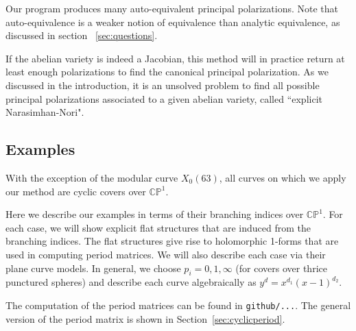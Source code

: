\documentclass[12pt,reqno]{amsart}
\newcommand{\C}{\mathbb{C}}
\renewcommand{\P}{\mathbb{P}}
\theoremstyle{definition}
\theoremstyle{remark}
\begin{document}
Our program produces many auto-equivalent principal polarizations.  Note that auto-equivalence is a weaker notion of equivalence than analytic equivalence, as discussed in section ~\ref{sec:questions}. 

If the abelian variety is indeed a Jacobian, this method will in practice return at least enough polarizations to find the canonical principal polarization. As we discussed in the introduction, it is an unsolved problem to find all possible principal polarizations associated to a given abelian variety, called ``explicit Narasimhan-Nori". 


\subsection{Examples}
\label{sec:examples}

With the exception of the modular curve $X_0(63)$, all curves on which we apply our method are cyclic covers over $\C\P^1.$ 

Here we describe our examples in terms of their branching indices over $\C\P^1.$ For each case, we will show explicit flat structures that are induced from the branching indices. The flat structures give rise to holomorphic 1-forms that are used in computing period matrices. We will also describe each case via their plane curve models. In general, we choose $p_i = 0, 1, \infty$ (for covers over thrice punctured spheres) and describe each curve algebraically as $y^d = x^{d_1} (x-1)^{d_2}.$

The computation of the period matrices can be found in \texttt{github/...}. The general version of the period matrix is shown in Section~\ref{sec:cyclicperiod}.
\end{document}
